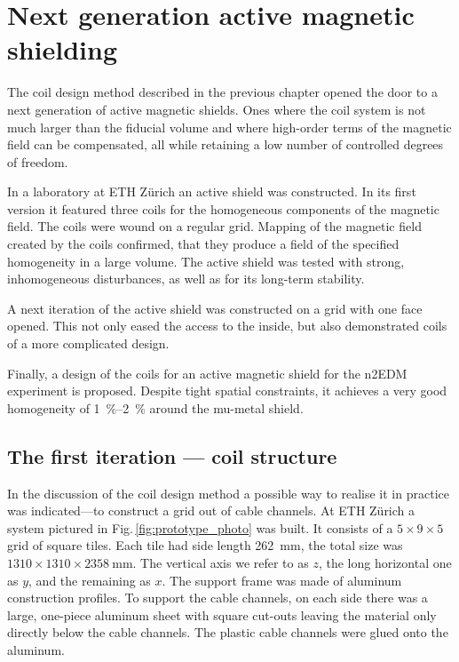 \chapter{Next generation active magnetic shielding}
\label{ch:sfc-prototype}

The coil design method described in the previous chapter opened the door to a next generation of active magnetic shields. Ones where the coil system is not much larger than the fiducial volume and where high-order terms of the magnetic field can be compensated, all while retaining a low number of controlled degrees of freedom.

In a laboratory at ETH Zürich an active shield was constructed. In its first version it featured three coils for the homogeneous components of the magnetic field. The coils were wound on a regular grid. Mapping of the magnetic field created by the coils confirmed, that they produce a field of the specified homogeneity in a large volume. The active shield was tested with strong, inhomogeneous disturbances, as well as for its long-term stability.

A next iteration of the active shield was constructed on a grid with one face opened. This not only eased the access to the inside, but also demonstrated coils of a more complicated design.

Finally, a design of the coils for an active magnetic shield for the n2EDM experiment is proposed. Despite tight spatial constraints, it achieves a very good homogeneity of \SIrange[range-phrase=--,range-units=single]{1}{2}{\percent} around the mu-metal shield.




\section{The first iteration --- coil structure}
In the discussion of the coil design method a possible way to realise it in practice was indicated---to construct a grid out of cable channels. At ETH Zürich a system pictured in Fig.\,\ref{fig:prototype_photo} was built. It consists of a $5 \times 9 \times 5$ grid of square tiles. Each tile had side length \SI{262}{\milli\meter}, the total size was $1310 \times 1310 \times \SI{2358}{\milli\meter}$. The vertical axis we refer to as $z$, the long horizontal one as $y$, and the remaining as $x$. The support frame was made of aluminum construction profiles. To support the cable channels, on each side there was a large, one-piece aluminum sheet with square cut-outs leaving the material only directly below the cable channels. The plastic cable channels were glued onto the aluminum.

